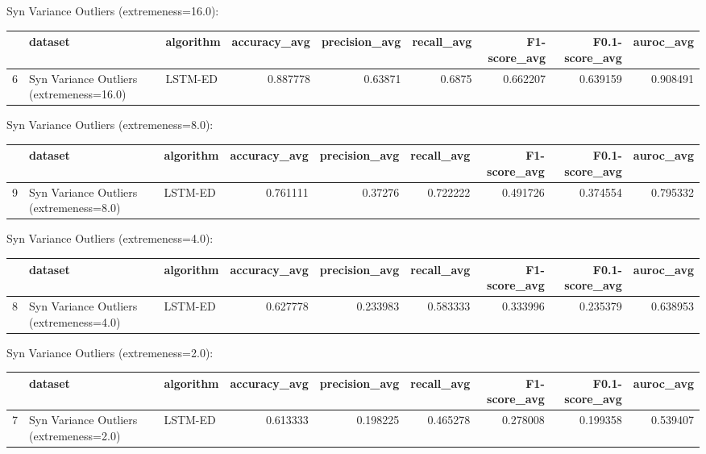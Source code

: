 Syn Variance Outliers (extremeness=16.0):

\begin{tabular}{rllrrrrrr}
\hline
    & dataset                                  & algorithm   &   accuracy\_avg &   precision\_avg &   recall\_avg &   F1-score\_avg &   F0.1-score\_avg &   auroc\_avg \\
\hline
  6 & Syn Variance Outliers (extremeness=16.0) & LSTM-ED     &       0.887778 &         0.63871 &       0.6875 &       0.662207 &         0.639159 &    0.908491 \\
\hline
\end{tabular}

Syn Variance Outliers (extremeness=8.0):

\begin{tabular}{rllrrrrrr}
\hline
    & dataset                                 & algorithm   &   accuracy\_avg &   precision\_avg &   recall\_avg &   F1-score\_avg &   F0.1-score\_avg &   auroc\_avg \\
\hline
  9 & Syn Variance Outliers (extremeness=8.0) & LSTM-ED     &       0.761111 &         0.37276 &     0.722222 &       0.491726 &         0.374554 &    0.795332 \\
\hline
\end{tabular}

Syn Variance Outliers (extremeness=4.0):

\begin{tabular}{rllrrrrrr}
\hline
    & dataset                                 & algorithm   &   accuracy\_avg &   precision\_avg &   recall\_avg &   F1-score\_avg &   F0.1-score\_avg &   auroc\_avg \\
\hline
  8 & Syn Variance Outliers (extremeness=4.0) & LSTM-ED     &       0.627778 &        0.233983 &     0.583333 &       0.333996 &         0.235379 &    0.638953 \\
\hline
\end{tabular}

Syn Variance Outliers (extremeness=2.0):

\begin{tabular}{rllrrrrrr}
\hline
    & dataset                                 & algorithm   &   accuracy\_avg &   precision\_avg &   recall\_avg &   F1-score\_avg &   F0.1-score\_avg &   auroc\_avg \\
\hline
  7 & Syn Variance Outliers (extremeness=2.0) & LSTM-ED     &       0.613333 &        0.198225 &     0.465278 &       0.278008 &         0.199358 &    0.539407 \\
\hline
\end{tabular}

